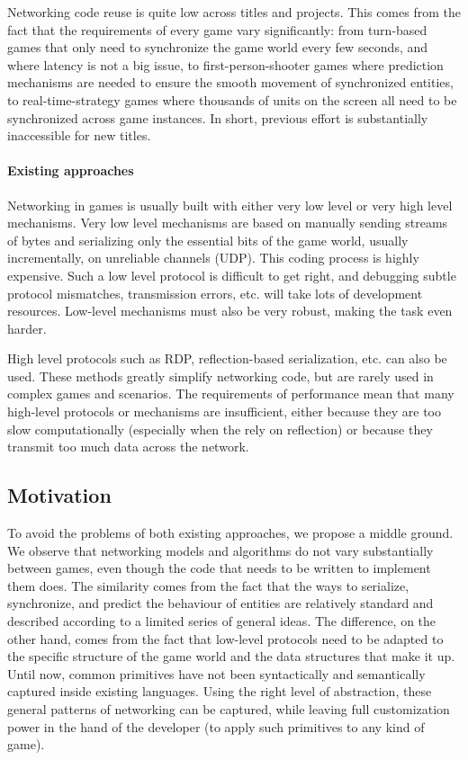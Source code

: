 Networking code reuse is quite low across titles and projects. This comes from the fact that the requirements of every game vary significantly: from turn-based games that only need to synchronize the game world every few seconds, and where latency is not a big issue, to first-person-shooter games where prediction mechanisms are needed to ensure the smooth movement of synchronized entities, to real-time-strategy games where thousands of units on the screen all need to be synchronized across game instances. In short, previous effort is substantially inaccessible for new titles.

\paragraph*{Existing approaches}
Networking in games is usually built with either very low level or very high level mechanisms. Very low level mechanisms are based on manually sending streams of bytes and serializing only the essential bits of the game world, usually incrementally, on unreliable channels (UDP). This coding process is highly expensive. Such a low level protocol is difficult to get right, and debugging subtle protocol mismatches, transmission errors, etc. will take lots of development resources. Low-level mechanisms must also be very robust, making the task even harder.

High level protocols such as RDP, reflection-based serialization, etc. can also be used. These methods greatly simplify  networking code, but are rarely used in complex games and scenarios. The requirements of performance mean that many high-level protocols or mechanisms are insufficient, either because they are too slow computationally (especially when the rely on reflection) or because they transmit too much data across the network.

\subsection*{Motivation}

To avoid the problems of both existing approaches, we propose a middle ground. We observe that networking models and algorithms do not vary substantially between games, even though the code that needs to be written to implement them does. The similarity comes from the fact that the ways to serialize, synchronize, and predict the behaviour of entities are relatively standard and described according to a limited series of general ideas. The difference, on the other hand, comes from the fact that low-level protocols need to be adapted to the specific structure of the game world and the data structures that make it up. Until now, common primitives have not been syntactically and semantically captured inside existing languages. Using the right level of abstraction, these general patterns of networking can be captured, while leaving full customization power in the hand of the developer (to apply such primitives to any kind of game).

